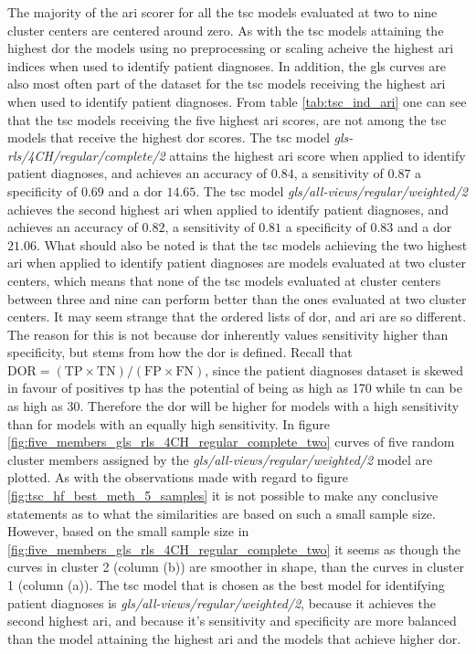 The majority of the \acrshort{ari} scorer for all the \acrshort{tsc} models evaluated at two to nine cluster centers are centered around zero. As with the \acrshort{tsc} models attaining the highest \acrshort{dor} the models using no preprocessing or scaling acheive the highest \acrshort{ari} indices when used to identify patient diagnoses. In addition, the \acrshort{gls} curves are also most often part of the dataset for the \acrshort{tsc} models receiving the highest \acrshort{ari} when used to identify patient diagnoses. From table \ref{tab:tsc_ind_ari} one can see that the \acrshort{tsc} models receiving the five highest \acrshort{ari} scores, are not among the \acrshort{tsc} models that receive the highest \acrshort{dor} scores. The \acrshort{tsc} model \textit{gls-rls/4CH/regular/complete/2} attains the highest \acrshort{ari} score when applied to identify patient diagnoses, and achieves an accuracy of $0.84$, a sensitivity of $0.87$ a specificity of $0.69$ and a \acrshort{dor} $14.65$. The \acrshort{tsc} model \textit{gls/all-views/regular/weighted/2} achieves the second highest \acrshort{ari} when applied to identify patient diagnoses, and achieves an accuracy of $0.82$, a sensitivity of $0.81$ a specificity of $0.83$ and a \acrshort{dor} $21.06$. What should also be noted is that the \acrshort{tsc} models achieving the two highest \acrshort{ari} when applied to identify patient diagnoses are models evaluated at two cluster centers, which means that none of the \acrshort{tsc} models evaluated at cluster centers between three and nine can perform better than the ones evaluated at two cluster centers. It may seem strange that the ordered lists of \acrshort{dor}, and \acrshort{ari} are so different. The reason for this is not because \acrshort{dor} inherently values sensitivity higher than specificity, but stems from how the \acrshort{dor} is defined. Recall that $\mathrm{DOR = ( TP \times TN )/ (FP \times FN)}$, since the patient diagnoses dataset is skewed in favour of positives \acrshort{tp} has the potential of being as high as 170 while \acrshort{tn} can be as high as 30. Therefore the \acrshort{dor} will be higher for models with a high sensitivity than for models with an equally high sensitivity. In figure \ref{fig:five_members_gls_rls_4CH_regular_complete_two} curves of five random cluster members assigned by the \textit{gls/all-views/regular/weighted/2} model are plotted. As with the observations made with regard to figure \ref{fig:tsc_hf_best_meth_5_samples} it is not possible to make any conclusive statements as to what the similarities are based on such a small sample size. However, based on the small sample size in \ref{fig:five_members_gls_rls_4CH_regular_complete_two} it seems as though the curves in cluster 2 (column (b)) are smoother in shape, than the curves in cluster 1 (column (a)). The \acrshort{tsc} model that is chosen as the best model for identifying patient diagnoses is \textit{gls/all-views/regular/weighted/2}, because it achieves the second highest \acrshort{ari}, and because it's sensitivity and specificity are more balanced than the model attaining the highest \acrshort{ari} and the models that achieve higher \acrshort{dor}.

